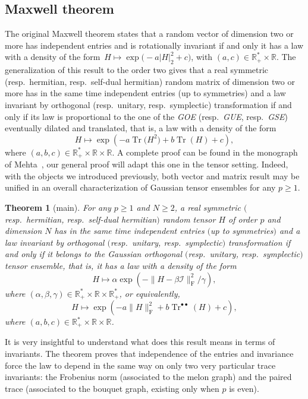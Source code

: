 \documentclass[pdftex]{sigma}
\numberwithin{equation}{section}
\newtheorem{Theorem}{Theorem}[section]
\theoremstyle{definition}
\begin{document}
\subsection{Maxwell theorem}

The original Maxwell theorem states that a random vector of dimension two or more has independent entries and is rotationally invariant if and only it has a law with a density of the form~${H \mapsto \exp\bigl(-a\vert H \vert_2^2 + c\bigr)}$,
with $(a,c) \in \mathbb{R}^*_+ \times \mathbb{R}$. The generalization of this result to the order two gives that a real symmetric (resp.\ hermitian, resp.\ self-dual hermitian) random matrix of dimension two or more has in the same time independent entries (up to symmetries) and a law invariant by orthogonal (resp.\ unitary, resp.\ symplectic) transformation if and only if its law is proportional to the one of the {\em GOE} (resp.\ {\em GUE}, resp.\ {\em GSE}) eventually dilated and translated, that is, a law with a density of the form
\[ H \mapsto \exp \left( - a \operatorname{Tr}\bigl(H^2\bigr) + b \operatorname{Tr}(H) + c \right),\]
where $(a,b,c) \in \mathbb{R}^*_+ \times \mathbb{R} \times \mathbb{R}$. A complete proof can be found in the monograph of Mehta~\cite{Meh2004}, our general proof will adapt this one in the tensor setting. Indeed, with the objects we introduced previously, both vector and matrix result may be unified in an overall characterization of Gaussian tensor ensembles for any $p\geq 1$.

\begin{Theorem}[main]\label{maxwell}
For any $p\geq 1$ and $N\geq 2$, a real symmetric $($resp.\ hermitian, resp.\ self-dual hermitian$)$ random tensor $H$ of order $p$ and dimension $N$ has in the same time independent entries $($up to symmetries$)$ and a law invariant by orthogonal $($resp.\ unitary, resp.\ symplectic$)$ transformation if and only if it belongs to the Gaussian orthogonal $($resp.\ unitary, resp.\ symplectic$)$ tensor ensemble, that is, it has a law with a density of the form
\[ H \mapsto \alpha \exp \left( - \| H - \beta \mathcal{I} \|_{\mathrm{F}}^2 / \gamma \right),\]
where $(\alpha,\beta,\gamma) \in \mathbb{R}^*_+ \times \mathbb{R} \times \mathbb{R}^*_+$,
or equivalently,
\[ H \mapsto \exp \left( - a \| H \|_{\mathrm{F}}^2 + b \operatorname{Tr}^{\bullet \bullet}(H) + c \right),\]
where $(a,b,c) \in \mathbb{R}^*_+ \times \mathbb{R} \times \mathbb{R}$.
\end{Theorem}

It is very insightful to understand what does this result means in terms of invariants. The theorem proves that independence of the entries and invariance force the law to depend in the same way on only two very particular trace invariants: the Frobenius norm (associated to the melon graph) and the paired trace (associated to the bouquet graph, existing only when $p$ is even).
\end{document}
